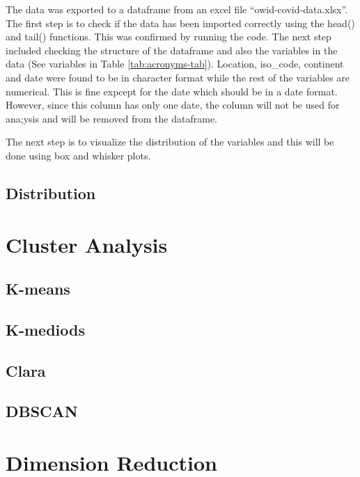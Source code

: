 \documentclass[
]{article}
\begin{document}
The data was exported to a dataframe from an excel file ``owid-covid-data.xlsx''. The first step is to check if the data has been imported correctly using the head() and tail() functions. This was confirmed by running the code. The next step included checking the structure of the dataframe and also the variables in the data (See variables in Table \ref{tab:acronyms-tab}). Location, iso\_code, continent and date were found to be in character format while the rest of the variables are numerical. This is fine expcept for the date which should be in a date format. However, since this column has only one date, the column will not be used for ana;ysis and will be removed from the dataframe.

The next step is to visualize the distribution of the variables and this will be done using box and whisker plots.

\hypertarget{distribution}{%
\subsection{Distribution}\label{distribution}}

\hypertarget{cluster-analysis}{%
\section{Cluster Analysis}\label{cluster-analysis}}

\hypertarget{k-means}{%
\subsection{K-means}\label{k-means}}

\hypertarget{k-mediods}{%
\subsection{K-mediods}\label{k-mediods}}

\hypertarget{clara}{%
\subsection{Clara}\label{clara}}

\hypertarget{dbscan}{%
\subsection{DBSCAN}\label{dbscan}}

\hypertarget{dimension-reduction}{%
\section{Dimension Reduction}\label{dimension-reduction}}
\end{document}
